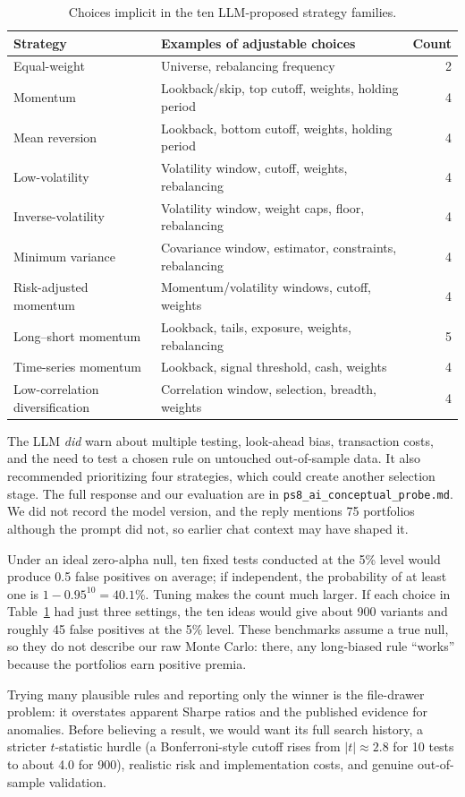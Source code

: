 \begin{table}[htbp]
\centering\scriptsize
\caption{Choices implicit in the ten LLM-proposed strategy families.}
\label{tab:g-ideas}
\begin{tabular}{p{.27\linewidth}p{.60\linewidth}r}
\toprule
Strategy & Examples of adjustable choices & Count\\
\midrule
Equal-weight & Universe, rebalancing frequency & 2\\
Momentum & Lookback/skip, top cutoff, weights, holding period & 4\\
Mean reversion & Lookback, bottom cutoff, weights, holding period & 4\\
Low-volatility & Volatility window, cutoff, weights, rebalancing & 4\\
Inverse-volatility & Volatility window, weight caps, floor, rebalancing & 4\\
Minimum variance & Covariance window, estimator, constraints, rebalancing & 4\\
Risk-adjusted momentum & Momentum/volatility windows, cutoff, weights & 4\\
Long--short momentum & Lookback, tails, exposure, weights, rebalancing & 5\\
Time-series momentum & Lookback, signal threshold, cash, weights & 4\\
Low-correlation diversification & Correlation window, selection, breadth, weights & 4\\
\bottomrule
\end{tabular}
\end{table}

The LLM \emph{did} warn about multiple testing, look-ahead bias, transaction
costs, and the need to test a chosen rule on untouched out-of-sample data. It
also recommended prioritizing four strategies, which could create another
selection stage. The full response and our evaluation are in
\texttt{ps8\_ai\_conceptual\_probe.md}. We did not record the model version,
and the reply mentions 75 portfolios although the prompt did not, so earlier
chat context may have shaped it.

Under an ideal zero-alpha null, ten fixed tests conducted at the 5\% level
would produce 0.5 false positives on average; if independent, the probability
of at least one is $1-0.95^{10}=40.1\%$. Tuning makes the count much larger.
If each choice in Table~\ref{tab:g-ideas} had just three settings, the ten
ideas would give about 900 variants and roughly 45 false positives at the
5\% level. These benchmarks assume a true null, so they do not describe our
raw Monte Carlo: there, any long-biased rule ``works'' because the portfolios
earn positive premia.

Trying many plausible rules and reporting only the winner is the file-drawer
problem: it overstates apparent Sharpe ratios and the published evidence for
anomalies. Before believing a result, we would want its full search history,
a stricter $t$-statistic hurdle (a Bonferroni-style cutoff rises from
$|t|\approx2.8$ for 10 tests to about 4.0 for 900), realistic risk and
implementation costs, and genuine out-of-sample validation.
